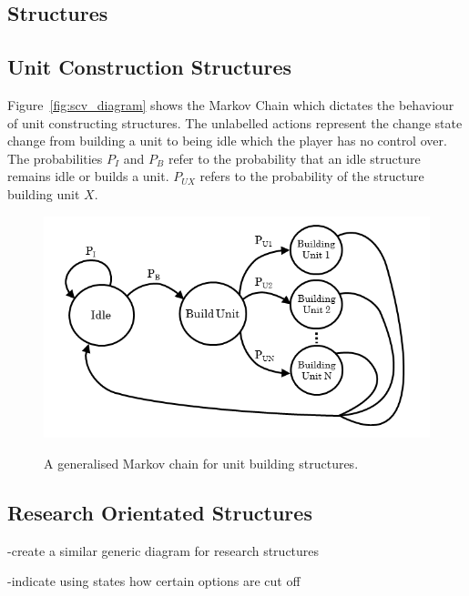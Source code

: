 \subsection{Structures}

\subsection{Unit Construction Structures}


Figure~\ref{fig:scv_diagram} shows the Markov Chain which dictates the behaviour of unit constructing structures. The unlabelled actions represent the change state change from building a unit to being idle which the player has no control over. The probabilities \(P_{I}\) and \(P_{B}\) refer to the probability that an idle structure remains idle or builds a unit. \(P_{UX}\) refers to the probability of the structure building unit \(X\).

\begin{figure}
\centering
\includegraphics[scale=0.8, trim = 0cm 0cm 0cm 0cm]{diagrams/building_units}
\label{fig:barracks_diagram}
\caption{A generalised Markov chain for unit building structures.}
\end{figure}

\subsection{Research Orientated Structures}

-create a similar generic diagram for research structures

-indicate using states how certain options are cut off
